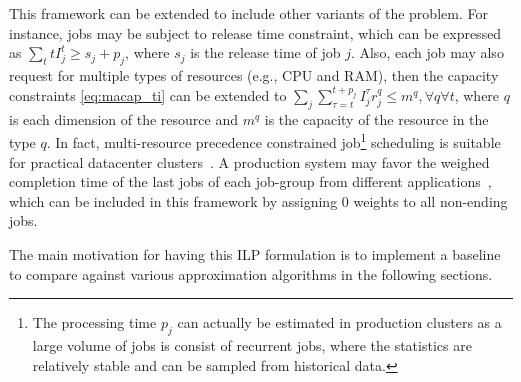 This framework can be extended to include other variants of the problem. For instance, jobs may be subject to release time constraint, which can be expressed as $\sum_t tI^t_j \geq s_j + p_j$, where $s_j$ is the release time of job $j$. Also, each job may also request for multiple types of resources (e.g., CPU and RAM), then the capacity constraints \eqref{eq:macap_ti} can be extended to $\sum_{j} \sum_{\tau=t}^{t + p_j} I^\tau_j r^q_j \leq m^q, \forall q\forall t$, where $q$ is each dimension of the resource and $m^q$ is the capacity of the resource in the type $q$. In fact, multi-resource precedence constrained job\footnote{The processing time $p_j$ can actually be estimated in production clusters as a large volume of jobs is consist of recurrent jobs, where the statistics are relatively stable and can be sampled from historical data.} scheduling is suitable for practical datacenter clusters~\cite{graphene}. A production system may favor the weighed completion time of the last jobs of each job-group from different applications~\cite{tetris}, which can be included in this framework by assigning $0$ weights to all non-ending jobs.

The main motivation for having this ILP formulation is to implement a baseline to compare against various approximation algorithms in the following sections. 
